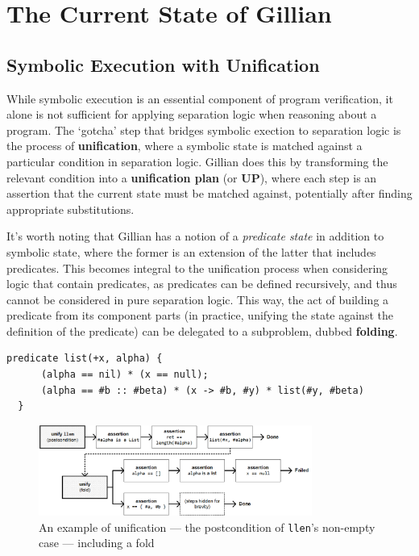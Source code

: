 
\chapter{The Current State of Gillian}\label{sec:current}

\section{Symbolic Execution with Unification}\label{sec:current:symex}


While symbolic execution is an essential component of program verification, it
alone is not sufficient for applying separation logic when reasoning about a
program. The `gotcha' step that bridges symbolic exection to separation logic is
the process of \textbf{unification}, where a symbolic state is matched against a
particular condition in separation logic. Gillian does this by transforming the
relevant condition into a \textbf{unification plan} (or \textbf{UP}), where each
step is an assertion that the current state must be matched against, potentially
after finding appropriate substitutions.

It's worth noting that Gillian has a notion of a \textit{predicate state} in
addition to symbolic state, where the former is an extension of the latter that
includes predicates. This becomes integral to the unification process when
considering logic that contain predicates, as predicates can be defined
recursively, and thus cannot be considered in pure separation logic. This way,
the act of building a predicate from its component parts (in practice, unifying
the state against the definition of the predicate) can be delegated to a
subproblem, dubbed \textbf{folding}.

\begin{lstlisting}[caption={
  The recursive list length function, in WISL
  \label{lst:llen-rec}}, style=code, numbers=none]
  predicate list(+x, alpha) {
      (alpha == nil) * (x == null);
      (alpha == #b :: #beta) * (x -> #b, #y) * list(#y, #beta)
  }
\end{lstlisting}

\begin{figure}
  \center{}
  \includegraphics[width=0.8\textwidth]{img/unify-example.png}
  \caption{
    An example of unification --- the postcondition of \texttt{llen}'s non-empty
    case --- including a fold}\label{fig:unify-example}
\end{figure}

